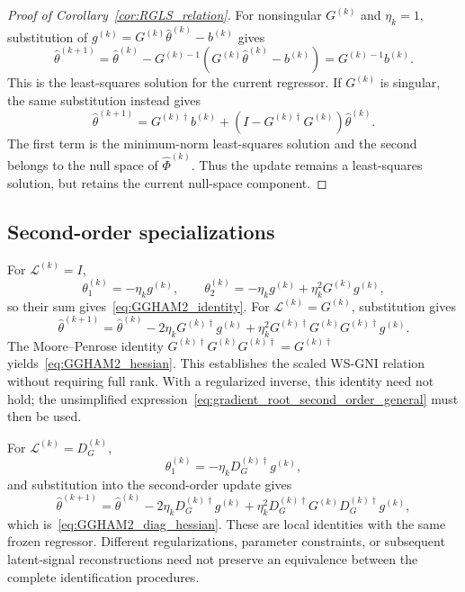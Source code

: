 \documentclass[11pt]{article}
\theoremstyle{remark}
\begin{document}
\begin{proof}[Proof of Corollary~\ref{cor:RGLS_relation}]
For nonsingular $G^{(k)}$ and $\eta_k=1$, substitution of
$g^{(k)}=G^{(k)}\hat\theta^{(k)}-b^{(k)}$ gives
\[
    \hat\theta^{(k+1)}
    =\hat\theta^{(k)}-G^{(k)-1}
       (G^{(k)}\hat\theta^{(k)}-b^{(k)})
    =G^{(k)-1}b^{(k)}.
\]
This is the least-squares solution for the current regressor.
If $G^{(k)}$ is singular, the same substitution instead gives
\begin{equation}
\label{eq:PL_rank_deficient_LS}
    \hat\theta^{(k+1)}
    =G^{(k)\dagger}b^{(k)}
     +(I-G^{(k)\dagger}G^{(k)})\hat\theta^{(k)}.
\end{equation}
The first term is the minimum-norm least-squares solution and the
second belongs to the null space of $\hat\Phi^{(k)}$.
Thus the update remains a least-squares solution, but retains the
current null-space component.
\end{proof}

\subsection{Second-order specializations}

For $\mathcal L^{(k)}=I$,
\[
    \theta_1^{(k)}=-\eta_kg^{(k)},\qquad
    \theta_2^{(k)}=-\eta_kg^{(k)}+\eta_k^2G^{(k)}g^{(k)},
\]
so their sum gives~\eqref{eq:GGHAM2_identity}.
For $\mathcal L^{(k)}=G^{(k)}$, substitution gives
\[
    \hat\theta^{(k+1)}=\hat\theta^{(k)}
      -2\eta_kG^{(k)\dagger}g^{(k)}
      +\eta_k^2G^{(k)\dagger}G^{(k)}G^{(k)\dagger}g^{(k)}.
\]
The Moore--Penrose identity
$G^{(k)\dagger}G^{(k)}G^{(k)\dagger}=G^{(k)\dagger}$
yields~\eqref{eq:GGHAM2_hessian}.
This establishes the scaled WS-GNI relation without requiring
full rank. With a regularized inverse, this identity need not hold;
the unsimplified expression~\eqref{eq:gradient_root_second_order_general}
must then be used.

For $\mathcal L^{(k)}=D_G^{(k)}$,
\[
    \theta_1^{(k)}=-\eta_kD_G^{(k)\dagger}g^{(k)},
\]
and substitution into the second-order update gives
\[
    \hat\theta^{(k+1)}=\hat\theta^{(k)}
      -2\eta_kD_G^{(k)\dagger}g^{(k)}
      +\eta_k^2D_G^{(k)\dagger}G^{(k)}D_G^{(k)\dagger}g^{(k)},
\]
which is~\eqref{eq:GGHAM2_diag_hessian}.
These are local identities with the same frozen regressor.
Different regularizations, parameter constraints, or subsequent
latent-signal reconstructions need not preserve an equivalence
between the complete identification procedures.
\end{document}
